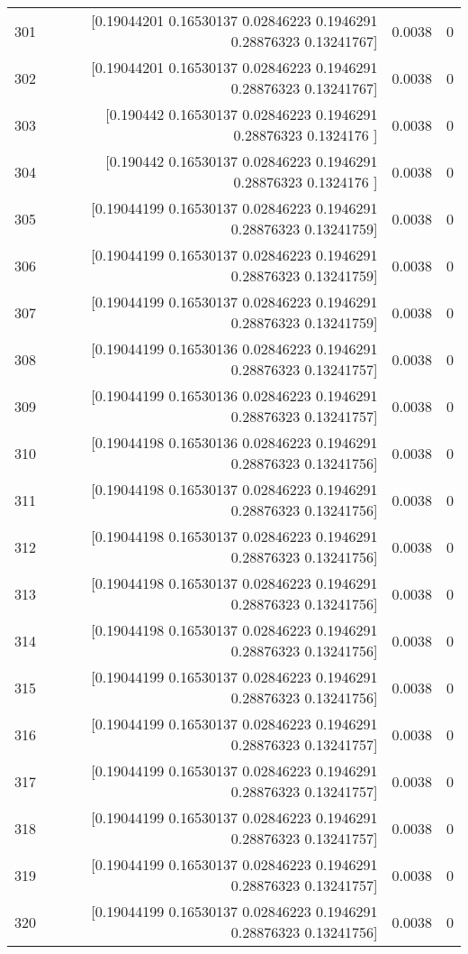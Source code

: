 \begin{longtable}{lrrr}
301 & [0.19044201 0.16530137 0.02846223 0.1946291  0.28876323 0.13241767] & 0.0038 & 0 \\
302 & [0.19044201 0.16530137 0.02846223 0.1946291  0.28876323 0.13241767] & 0.0038 & 0 \\
303 & [0.190442   0.16530137 0.02846223 0.1946291  0.28876323 0.1324176 ] & 0.0038 & 0 \\
304 & [0.190442   0.16530137 0.02846223 0.1946291  0.28876323 0.1324176 ] & 0.0038 & 0 \\
305 & [0.19044199 0.16530137 0.02846223 0.1946291  0.28876323 0.13241759] & 0.0038 & 0 \\
306 & [0.19044199 0.16530137 0.02846223 0.1946291  0.28876323 0.13241759] & 0.0038 & 0 \\
307 & [0.19044199 0.16530137 0.02846223 0.1946291  0.28876323 0.13241759] & 0.0038 & 0 \\
308 & [0.19044199 0.16530136 0.02846223 0.1946291  0.28876323 0.13241757] & 0.0038 & 0 \\
309 & [0.19044199 0.16530136 0.02846223 0.1946291  0.28876323 0.13241757] & 0.0038 & 0 \\
310 & [0.19044198 0.16530136 0.02846223 0.1946291  0.28876323 0.13241756] & 0.0038 & 0 \\
311 & [0.19044198 0.16530137 0.02846223 0.1946291  0.28876323 0.13241756] & 0.0038 & 0 \\
312 & [0.19044198 0.16530137 0.02846223 0.1946291  0.28876323 0.13241756] & 0.0038 & 0 \\
313 & [0.19044198 0.16530137 0.02846223 0.1946291  0.28876323 0.13241756] & 0.0038 & 0 \\
314 & [0.19044198 0.16530137 0.02846223 0.1946291  0.28876323 0.13241756] & 0.0038 & 0 \\
315 & [0.19044199 0.16530137 0.02846223 0.1946291  0.28876323 0.13241756] & 0.0038 & 0 \\
316 & [0.19044199 0.16530137 0.02846223 0.1946291  0.28876323 0.13241757] & 0.0038 & 0 \\
317 & [0.19044199 0.16530137 0.02846223 0.1946291  0.28876323 0.13241757] & 0.0038 & 0 \\
318 & [0.19044199 0.16530137 0.02846223 0.1946291  0.28876323 0.13241757] & 0.0038 & 0 \\
319 & [0.19044199 0.16530137 0.02846223 0.1946291  0.28876323 0.13241757] & 0.0038 & 0 \\
320 & [0.19044199 0.16530137 0.02846223 0.1946291  0.28876323 0.13241756] & 0.0038 & 0 \\

\end{longtable}
